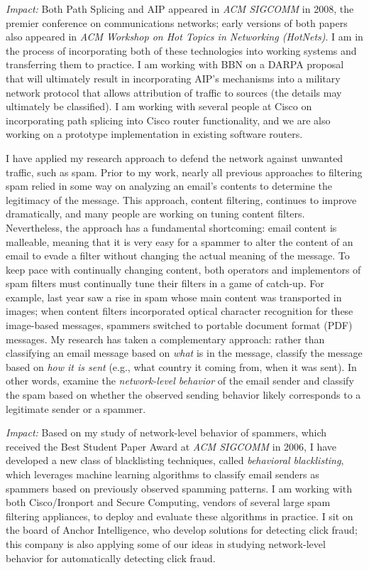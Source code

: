 {\em Impact:} Both Path Splicing and AIP appeared in {\em ACM SIGCOMM}
in 2008, the premier conference on communications networks; early
versions of both papers also appeared in {\em ACM Workshop on Hot Topics
in Networking (HotNets)}.  I am in the process of incorporating both of
these technologies into working systems and transferring them to
practice.  I am working with BBN on a DARPA proposal that will
ultimately result in incorporating AIP's mechanisms into a military
network protocol that allows attribution of traffic to sources (the
details may ultimately be classified).  I am working with several people
at Cisco on incorporating path splicing into Cisco router functionality,
and we are also working on a prototype implementation in existing
software routers.


I have applied my research approach to defend the network against
unwanted traffic, such as spam.  Prior to my work, nearly all previous
approaches to filtering spam relied in some way on analyzing an email's
contents to determine the legitimacy of the message.  This approach,
content filtering, continues to improve dramatically, and many people
are working on tuning content filters.  Nevertheless, the approach has a
fundamental shortcoming: email content is malleable, meaning that it is
very easy for a spammer to alter the content of an email to evade a
filter without changing the actual meaning of the message.  To keep pace
with continually changing content, both operators and implementors of
spam filters must continually tune their filters in a game of catch-up.
For example, last year saw a rise in spam whose main content was
transported in images; when content filters incorporated optical
character recognition for these image-based messages, spammers switched
to portable document format (PDF) messages.  My research has taken a
complementary approach: rather than classifying an email message based
on {\em what} is in the message, classify the message based on {\em how
it is sent} (e.g., what country it coming from, when it was sent).  In
other words, examine the {\em network-level behavior} of the email
sender and classify the spam based on whether the observed sending
behavior likely corresponds to a legitimate sender or a spammer.

{\em Impact:} Based on my study of network-level behavior of spammers,
which received the Best Student Paper Award at {\em ACM SIGCOMM} in
2006, I have developed a new class of blacklisting techniques, called
{\em behavioral blacklisting}, which leverages machine learning
algorithms to classify email senders as spammers based on previously
observed spamming patterns.  I am working with both Cisco/Ironport and
Secure Computing, vendors of several large spam filtering appliances, to
deploy and evaluate these algorithms in practice.  I sit on the board of
Anchor Intelligence, who develop solutions for detecting click fraud;
this company is also applying some of our ideas in studying
network-level behavior for automatically detecting click fraud.

